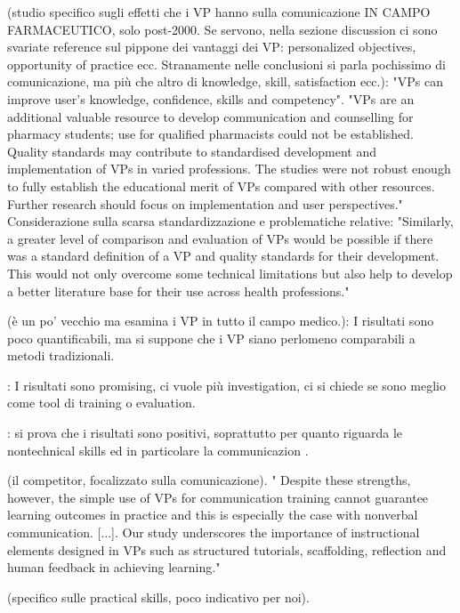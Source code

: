 \cite{richardson2019virtual} (studio specifico sugli effetti che i VP hanno sulla comunicazione IN CAMPO FARMACEUTICO, solo post-2000. Se servono, nella sezione discussion ci sono svariate reference sul pippone dei vantaggi dei VP: personalized objectives, opportunity of practice ecc. Stranamente nelle conclusioni si parla pochissimo di comunicazione, ma più che altro di knowledge, skill, satisfaction ecc.): "VPs can improve user’s knowledge, confidence,
skills and competency".  "VPs are an additional valuable resource to develop communication and counselling for pharmacy students; use for qualified pharmacists could not be established. Quality standards may contribute to standardised development and implementation of VPs in varied professions. The studies were not robust enough to fully establish the educational merit of VPs compared with other resources. Further research should focus on implementation and user perspectives."
Considerazione sulla scarsa standardizzazione e problematiche relative: "Similarly, a greater level of comparison and evaluation of VPs would be possible if there was a standard definition of a VP and quality
standards for their development. This would not only overcome some technical limitations but also help to develop a better literature base for their use across health professions."

\cite{cook2010computerized} (è un po' vecchio ma esamina i VP in tutto il campo medico.): I risultati sono poco quantificabili, ma si suppone che i VP siano perlomeno comparabili a metodi tradizionali. 

\cite{duff2016online}: I risultati sono promising, ci vuole più investigation, ci si chiede se sono meglio come tool di training o evaluation. 

\cite{peddle2016virtual}: si prova che i risultati sono positivi, soprattutto per quanto riguarda le nontechnical skills ed in particolare la communicazion . 

\cite{lee2020effective} (il competitor, focalizzato sulla comunicazione). " Despite these strengths, however, the simple use of VPs for communication training cannot guarantee learning outcomes in practice and this is especially the case with nonverbal communication. [...]. Our study underscores the importance of instructional elements designed in VPs such as structured tutorials, scaffolding, reflection and human feedback in achieving learning."

\cite{rourke2019does} (specifico sulle practical skills, poco indicativo per noi).  

